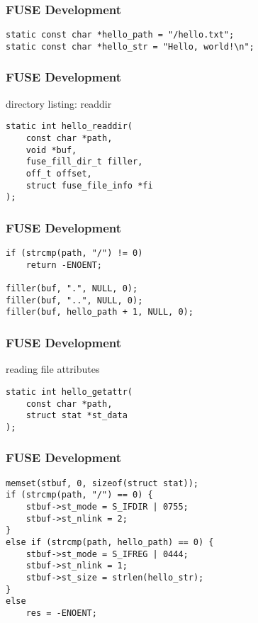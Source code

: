 \documentclass[dvipsnames]{beamer}
\begin{document}
\begin{frame}[fragile]
  \frametitle{FUSE Development}

  \begin{example}
    \begin{lstlisting}
static const char *hello_path = "/hello.txt";
static const char *hello_str = "Hello, world!\n";
    \end{lstlisting}
  \end{example}
\end{frame}

\begin{frame}[fragile]
  \frametitle{FUSE Development}

  \begin{block}{directory listing: readdir}
    \begin{lstlisting}
static int hello_readdir(
    const char *path,
    void *buf,
    fuse_fill_dir_t filler,
    off_t offset,
    struct fuse_file_info *fi
);
    \end{lstlisting}
  \end{block}
\end{frame}

\begin{frame}[fragile]
  \frametitle{FUSE Development}

  \begin{example}
    \begin{lstlisting}
if (strcmp(path, "/") != 0)
    return -ENOENT;

filler(buf, ".", NULL, 0);
filler(buf, "..", NULL, 0);
filler(buf, hello_path + 1, NULL, 0);
    \end{lstlisting}
  \end{example}
\end{frame}

\begin{frame}[fragile]
  \frametitle{FUSE Development}

  \begin{block}{reading file attributes}
    \begin{lstlisting}
static int hello_getattr(
    const char *path,
    struct stat *st_data
);
    \end{lstlisting}
  \end{block}
\end{frame}

\begin{frame}[fragile]
  \frametitle{FUSE Development}

  \begin{example}
    \begin{lstlisting}
memset(stbuf, 0, sizeof(struct stat));
if (strcmp(path, "/") == 0) {
    stbuf->st_mode = S_IFDIR | 0755;
    stbuf->st_nlink = 2;
}
else if (strcmp(path, hello_path) == 0) {
    stbuf->st_mode = S_IFREG | 0444;
    stbuf->st_nlink = 1;
    stbuf->st_size = strlen(hello_str);
}
else
    res = -ENOENT;
    \end{lstlisting}
  \end{example}
\end{frame}
\end{document}
